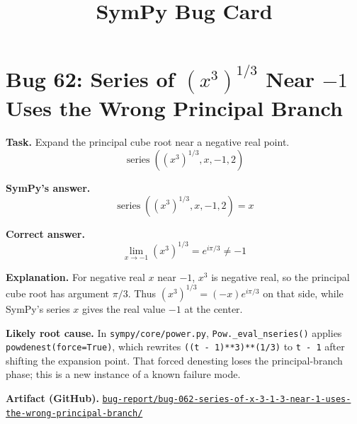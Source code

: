\documentclass[11pt]{article}
\title{SymPy Bug Card}
\author{}
\date{}
\newcommand{\artifactrepo}{https://github.com/TODO-org/TODO-repo}
\newcommand{\bugbundle}[1]{\href{\artifactrepo/tree/main/bug-report/#1}{\nolinkurl{bug-report/#1/}}}
\begin{document}
\maketitle

\section*{Bug 62: Series of \texorpdfstring{\((x^3)^{1/3}\)}{(x**3)**(1/3)} Near \texorpdfstring{\(-1\)}{-1} Uses the Wrong Principal Branch}

\begin{counterexamplebox}
\textbf{Task.} Expand the principal cube root near a negative real point.
\[
\operatorname{series}\!\left((x^3)^{1/3}, x, -1, 2\right)
\]

\medskip
\textbf{SymPy's answer.}
\[
\operatorname{series}\!\left((x^3)^{1/3}, x, -1, 2\right)=x
\]

\medskip
\textbf{Correct answer.}
\[
\lim_{x\to -1}(x^3)^{1/3}=e^{i\pi/3}\neq -1
\]

\medskip
\textbf{Explanation.} For negative real \(x\) near \(-1\), \(x^3\) is negative real, so the principal cube root has argument \(\pi/3\).  Thus \((x^3)^{1/3}=(-x)e^{i\pi/3}\) on that side, while SymPy's series \(x\) gives the real value \(-1\) at the center.

\medskip
\textbf{Likely root cause.} In \nolinkurl{sympy/core/power.py}, \texttt{Pow.\_eval\_nseries()} applies \texttt{powdenest(force=True)}, which rewrites \texttt{((t - 1)**3)**(1/3)} to \texttt{t - 1} after shifting the expansion point.  That forced denesting loses the principal-branch phase; this is a new instance of a known failure mode.

\medskip
\textbf{Artifact (GitHub).} \bugbundle{bug-062-series-of-x-3-1-3-near-1-uses-the-wrong-principal-branch}
\end{counterexamplebox}
\end{document}
